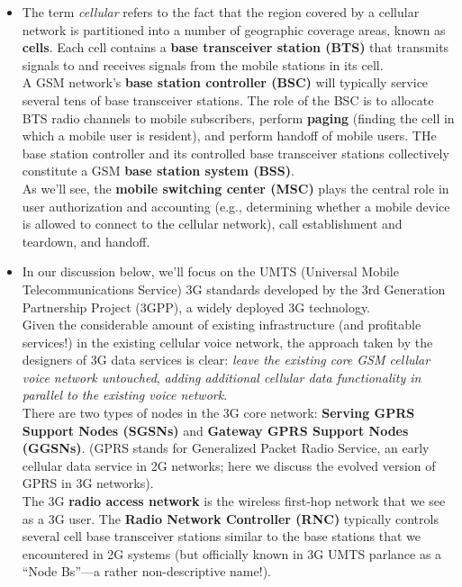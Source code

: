 \begin{itemize}
\item
The term \textit{cellular} refers to the fact that the region covered by a cellular network is partitioned into a number of geographic coverage areas, known as \textbf{cells}. Each cell contains a \textbf{base transceiver station (BTS)} that transmits signals to and receives signals from the mobile stations in its cell.\\
A GSM network's \textbf{base station controller (BSC)} will typically service several tens of base transceiver stations. The role of the BSC is to allocate BTS radio channels to mobile subscribers, perform \textbf{paging} (finding the cell in which a mobile user is resident), and perform handoff of mobile users. THe base station controller and its controlled base transceiver stations collectively constitute a GSM \textbf{base station system (BSS)}.\\
As we'll see, the \textbf{mobile switching center (MSC)} plays the central role in user authorization and accounting (e.g., determining whether a mobile device is allowed to connect to the cellular network), call establishment and teardown, and handoff.

\item
In our discussion below, we'll focus on the UMTS (Universal Mobile Telecommunications Service) 3G standards developed by the 3rd Generation Partnership Project (3GPP), a widely deployed 3G technology.\\
Given the considerable amount of existing infrastructure (and profitable services!) in the existing cellular voice network, the approach taken by the designers of 3G data services is clear: \textit{leave the existing core GSM cellular voice network untouched}, \textit{adding additional cellular data functionality in parallel to the existing voice network}.\\
There are two types of nodes in the 3G core network: \textbf{Serving GPRS Support Nodes (SGSNs)} and \textbf{Gateway GPRS Support Nodes (GGSNs)}. (GPRS stands for Generalized Packet Radio Service, an early cellular data service in 2G networks; here we discuss the evolved version of GPRS in 3G networks).\\
The 3G \textbf{radio access network} is the wireless first-hop network that we see as a 3G user. The \textbf{Radio Network Controller (RNC)} typically controls several cell base transceiver stations similar to the base stations that we encountered in 2G systems (but officially known in 3G UMTS parlance as a ``Node Bs''---a rather non-descriptive name!).


\end{itemize}
